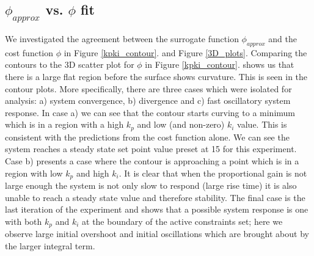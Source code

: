 \documentclass[conference]{IEEEtran}
\theoremstyle{definition}
\begin{document}
\subsection{$\phi_{approx}$ vs. $\phi$ fit}
\noindent We investigated the agreement between the surrogate function $\phi_{approx}$ and the cost function $\phi$ in Figure \ref{kpki_contour}. and Figure \ref{3D_plots}. Comparing the contours to the 3D scatter plot for $\phi$ in Figure \ref{kpki_contour}. shows us that there is a large flat region before the surface shows curvature. This is seen in the contour plots. More specifically, there are three cases which were isolated for analysis: a) system convergence, b) divergence and c) fast oscillatory system response. In case a) we can see that the contour starts curving to a minimum which is in a region with a high $k_p$ and low (and non-zero) $k_i$ value. This is consistent with the predictions from the cost function alone. We can see the system reaches a steady state set point value preset at 15 for this experiment. Case b) presents a case where the contour is approaching a point which is in a region with low $k_p$ and high $k_i$. It is clear that when the proportional gain is not large enough the system is not only slow to respond (large rise time) it is also unable to reach a steady state value and therefore stability. The final case is the last iteration of the experiment and shows that a possible system response is one with both $k_p$ and $k_i$ at the boundary of the active constraints set; here we observe large initial overshoot and initial oscillations which are brought about by the larger integral term. 
\end{document}
